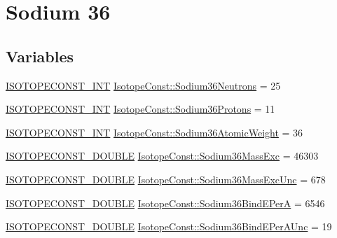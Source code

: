 \hypertarget{group___isotope_const-_sodium-_na36}{}\section{Sodium 36}
\label{group___isotope_const-_sodium-_na36}
\subsection*{Variables}
\begin{DoxyCompactItemize}
\item 
\mbox{\hyperlink{group___isotope_const-_macros_ga5f18360b3e99483a35c32d789e62621c}{I\+S\+O\+T\+O\+P\+E\+C\+O\+N\+S\+T\+\_\+\+I\+NT}} \mbox{\hyperlink{group___isotope_const-_sodium-_na36_ga817b17cbcc217a783f749abd6e5a3dfa}{Isotope\+Const\+::\+Sodium36\+Neutrons}} = 25
\item 
\mbox{\hyperlink{group___isotope_const-_macros_ga5f18360b3e99483a35c32d789e62621c}{I\+S\+O\+T\+O\+P\+E\+C\+O\+N\+S\+T\+\_\+\+I\+NT}} \mbox{\hyperlink{group___isotope_const-_sodium-_na36_gae71afde0676acc9a42eda42b7ae4343d}{Isotope\+Const\+::\+Sodium36\+Protons}} = 11
\item 
\mbox{\hyperlink{group___isotope_const-_macros_ga5f18360b3e99483a35c32d789e62621c}{I\+S\+O\+T\+O\+P\+E\+C\+O\+N\+S\+T\+\_\+\+I\+NT}} \mbox{\hyperlink{group___isotope_const-_sodium-_na36_ga6f922378ca8fc5c8ec384ea5cf5f35aa}{Isotope\+Const\+::\+Sodium36\+Atomic\+Weight}} = 36
\item 
\mbox{\hyperlink{group___isotope_const-_macros_ga8f45a7272ce02c0b4c65c44636ed719a}{I\+S\+O\+T\+O\+P\+E\+C\+O\+N\+S\+T\+\_\+\+D\+O\+U\+B\+LE}} \mbox{\hyperlink{group___isotope_const-_sodium-_na36_gaa5bf643224bc3c65db6feb69151f82b5}{Isotope\+Const\+::\+Sodium36\+Mass\+Exc}} = 46303
\item 
\mbox{\hyperlink{group___isotope_const-_macros_ga8f45a7272ce02c0b4c65c44636ed719a}{I\+S\+O\+T\+O\+P\+E\+C\+O\+N\+S\+T\+\_\+\+D\+O\+U\+B\+LE}} \mbox{\hyperlink{group___isotope_const-_sodium-_na36_ga06056ec49fe5232edb9800ada30ae668}{Isotope\+Const\+::\+Sodium36\+Mass\+Exc\+Unc}} = 678
\item 
\mbox{\hyperlink{group___isotope_const-_macros_ga8f45a7272ce02c0b4c65c44636ed719a}{I\+S\+O\+T\+O\+P\+E\+C\+O\+N\+S\+T\+\_\+\+D\+O\+U\+B\+LE}} \mbox{\hyperlink{group___isotope_const-_sodium-_na36_ga2cf3cb5d5548f279f44f393a9712e6be}{Isotope\+Const\+::\+Sodium36\+Bind\+E\+PerA}} = 6546
\item 
\mbox{\hyperlink{group___isotope_const-_macros_ga8f45a7272ce02c0b4c65c44636ed719a}{I\+S\+O\+T\+O\+P\+E\+C\+O\+N\+S\+T\+\_\+\+D\+O\+U\+B\+LE}} \mbox{\hyperlink{group___isotope_const-_sodium-_na36_gae96396cccb244c7accdae3da64a2eeec}{Isotope\+Const\+::\+Sodium36\+Bind\+E\+Per\+A\+Unc}} = 19

\end{DoxyCompactItemize}
